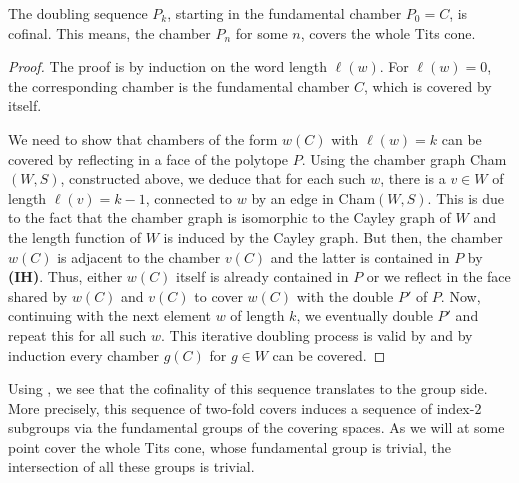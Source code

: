 \begin{theorem}\label{thm:cofinal}
    The doubling sequence \(P_k\), starting in the fundamental chamber \(P_0 = C\), is cofinal.
    This means, the chamber \(P_n\) for some \(n\), covers the whole Tits cone.
\end{theorem}
\begin{proof}
    The proof is by induction on the word length \(\ell(w)\).
    For \(\ell(w) = 0\), the corresponding chamber is the fundamental chamber \(C\), which is covered by itself.
    \par\noindent
    We need to show that chambers of the form \(w(C)\) with \(\ell(w) = k\) can be covered by reflecting in a face of the polytope \(P\).
    Using the chamber graph Cham\((W, S)\), constructed above, we deduce that for each such \(w\), there is a \(v \in W\) of length \(\ell(v) = k - 1\), connected to \(w\) by an edge in Cham\((W, S)\). %
    This is due to the fact that the chamber graph is isomorphic to the Cayley graph of  \(W\) and the length function of \(W\) is induced by the Cayley graph.
    But then, the chamber \(w(C)\) is adjacent to the chamber \(v(C)\) and the latter is contained in \(P\) by \textbf{(IH)}.
    Thus, either \(w(C)\) itself is already contained in \(P\) or we reflect in the face shared by \(w(C)\) and \(v(C)\) to cover \(w(C)\) with the double \(P'\) of \(P\).
    Now, continuing with the next element \(w\) of length \(k\), we eventually double \(P'\) and repeat this for all such \(w\).
    This iterative doubling process is valid by  and by induction every chamber \(g(C)\) for \(g \in W\) can be covered.
\end{proof}


\begin{remark}\label{rmk:groupseries}
    Using , we see that the cofinality of this sequence translates to the group side.
    More precisely, this sequence of two-fold covers induces a sequence of index-\(2\) subgroups via the fundamental groups of the covering spaces.
    As we will at some point cover the whole Tits cone, whose fundamental group is trivial, the intersection of all these groups is trivial.
\end{remark}

